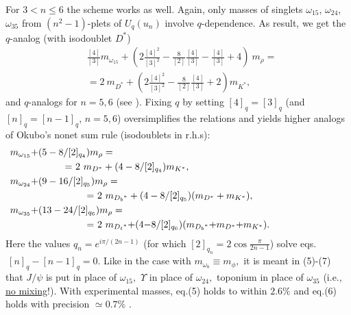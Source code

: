 \documentclass[twoside]{article}
\begin{document}
For $3<n\le 6$ the scheme works as well.
 Again, only masses of singlets ${\omega}_{15}$,
${\omega}_{24}$, ${\omega}_{35}$ from $(n^2-1)$-plets
of $U_q(u_n)$ involve $q$-dependence. As result, we get
the $q$-analog (with isodoublet $D^*$)
\begin{eqnarray}
 {}  &  \frac{[4]}{[3]} m_{\omega_{15}} {+} \left(
2\frac{[4]^2}{[3]^2}-\frac{8}{[2]}\frac{[4]}{[3]}-
                           \frac{[4]}{[3]}+4 \right)\ m_{\rho} =
                                         \nonumber   \\
{}  &  = 2\ m_{D^*} {+}
 \left( 2\frac{[4]^2}{[3]^2}-\frac{8}{[2]}\frac{[4]}{[3]} + 2 \right)
                    m_{K^*} ,  \label{(4)}
\end{eqnarray}
and $q$-analogs for $n{=}5,6$ (see  \cite{ga-ser,ga-bre,ga-uzh}). Fixing
$q$ by setting $[4]_q{=}[3]_q$ (and $[n]_q{=}[n{-}1]_q$, $n{=}5,6$)
oversimplifies the relations and yields higher analogs of
Okubo's nonet sum rule (isodoublets in r.h.s):
\begin{eqnarray}
\vspace{-3.2mm}
& \hspace{-28mm}  m_{{\omega}_{15}}{+}(5 - 8/[2]_{q_4}) m_{\rho} =
                                                      \nonumber \\
 & \hspace{-8mm}{=}~2\ m_{D^*}+(4 - 8/[2]_{q_4}) m_{K^*} ,  \\ \label{(5)}
& \hspace{-28mm} m_{{\omega}_{24}}{+}(9 - 16/[2]_{q_5}) m_{\rho} =
                                                  \nonumber \\
 &{=}~2\ m_{{D_b}^*}+(4-8/[2]_{q_5})(m_{D^*}+m_{K^*}) ,
                                                            \\ \label{(6)}
    & \hspace{-28mm} m_{{\omega}_{35}}{+}(13-24/[2]_{q_6}) m_{\rho} =
                                                   \nonumber \\
 &{=}~2\ m_{{D_t}^*}{+}(4{-}8/[2]_{q_6})
                        (m_{{D_b}^*}{+}m_{D^*}{+}m_{K^*}).   \label{(7)}
\vspace{0.6mm}
\end{eqnarray}
Here the values $q_n=e^{i\pi/(2n-1)}$
(for which $[2]_{q_n}=2\cos\frac{\pi}{2n{-}1}$)
solve eqs. $\ [n]_q-[n\!-\!1]_q=0$.
Like in the case with $m_{{\omega}_8}\equiv m_{\phi},$ it is meant
in (5)-(7) that $J/\psi $ is put in place of ${\omega }_{15},$
$\Upsilon$ in place of ${\omega }_{24},$ toponium in place of
${\omega }_{35}$ (i.e., \underline{no mixing}!).
With experimental masses, eq.(5) holds to within $ 2.6 \%$
and eq.(6) holds with precision $\simeq 0.7 \%$ .
\end{document}
